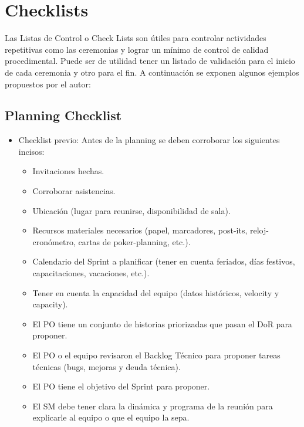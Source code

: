 \newpage
\section{Checklists}

Las Listas de Control o Check Lists son útiles para controlar actividades repetitivas como las ceremonias y lograr un mínimo de control de calidad procedimental. Puede ser de utilidad tener un listado de validación para el inicio de cada ceremonia y otro para el fin. 
A continuación se exponen algunos ejemplos propuestos por el autor:

\subsection{Planning Checklist}

\begin{itemize}
  
  \item {Checklist previo: Antes de la planning se deben corroborar los siguientes incisos:
  
  \begin{itemize}
    \item Invitaciones hechas.
    \item Corroborar asistencias.
    \item Ubicación (lugar para reunirse, disponibilidad de sala).
    \item Recursos materiales necesarios (papel, marcadores, post-its, reloj-cronómetro, cartas de poker-planning, etc.).
    \item Calendario del Sprint a planificar (tener en cuenta feriados, días festivos, capacitaciones, vacaciones, etc.).
    \item Tener en cuenta la capacidad del equipo (datos históricos, velocity y capacity).
    \item El PO tiene un conjunto de historias priorizadas que pasan el DoR para proponer.
    \item El PO o el equipo revisaron el Backlog Técnico para proponer tareas técnicas (bugs, mejoras y deuda técnica).
    \item El PO tiene el objetivo del Sprint para proponer.
    \item El SM debe tener clara la dinámica y programa de la reunión para explicarle al equipo o que el equipo la sepa.
  \end{itemize}
  }
  

\end{itemize}

